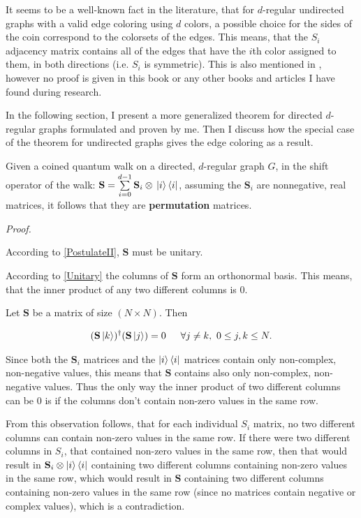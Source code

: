 It seems to be a well-known fact in the literature, that for $d$-regular undirected graphs with a valid edge coloring using $d$ colors, a possible choice for the sides of the coin correspond to the colorsets of the edges. This means, that the $S_i$ adjacency matrix contains all of the edges that have the $i$th color assigned to them, in both directions (i.e. $S_i$ is symmetric). This is also mentioned in \cite{Portugal}, however no proof is given in this book or any other books and articles I have found during research.

In the following section, I present a more generalized theorem for directed $d$-regular graphs formulated and proven by me. Then I discuss how the special case of the theorem for undirected graphs gives the edge coloring as a result.

\begin{theorem}
\label{PermutationMatricesTheorem}
Given a coined quantum walk on a directed, $d$-regular graph $G$, in the shift operator of the walk: $\mathbf{S} = \sum\limits_{i=0}^{d-1} \mathbf{S}_i \otimes{} \ket{i}\bra{i}$, assuming the $\mathbf{S}_{i}$ are nonnegative, real matrices, it follows that they are \textbf{permutation} matrices.
\end{theorem}

\textit{Proof.}

According to \hyperref[PostulateII]{[PostulateII]}, $\mathbf{S}$ must be unitary.

According to \hyperref[Unitary]{[Unitary]} the columns of $\mathbf{S}$ form an orthonormal basis. This means, that the inner product of any two different columns is $0$.

Let $\mathbf{S}$ be a matrix of size $(N\times{}N)$. Then

\begin{align*}
    (\mathbf{S}\ket{k})^{\dagger}(\mathbf{S}\ket{j}) = 0 \hspace{15pt}{} \forall{}j\neq{}k,\ 0\leq{}j,k\leq{}N.
\end{align*}

Since both the $\mathbf{S}_i$ matrices and the $\ket{i}\bra{i}$ matrices contain only non-complex, non-negative values, this means that $\mathbf{S}$ contains also only non-complex, non-negative values. Thus the only way the inner product of two different columns can be $0$ is if the columns don't contain non-zero values in the same row.

From this observation follows, that for each individual $S_i$ matrix, no two different columns can contain non-zero values in the same row. If there were two different columns in $S_i$, that contained non-zero values in the same row, then that would result in $\mathbf{S}_i \otimes \ket{i}\bra{i}$ containing two different columns containing non-zero values in the same row, which would result in $\mathbf{S}$ containing two different columns containing non-zero values in the same row (since no matrices contain negative or complex values), which is a contradiction.

